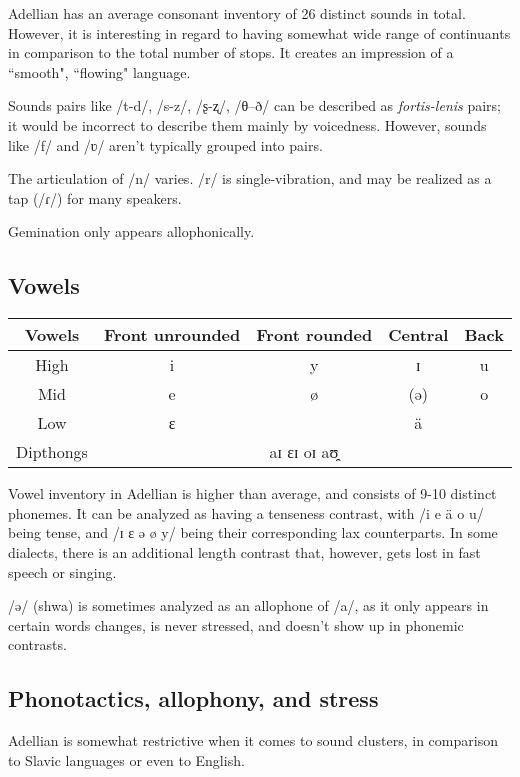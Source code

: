 \documentclass[12pt]{article}
\begin{document}
	Adellian has an average consonant inventory of 26 distinct sounds in total. However, it is interesting in regard to having somewhat wide range of continuants in comparison to the total number of stops. It creates an impression of a ``smooth", ``flowing" language.

	Sounds pairs like /t-d/, /s-z/, /ʂ-ʐ/, /θ–ð/ can be described as \emph{fortis-lenis} pairs; it would be incorrect to describe them mainly by voicedness. However, sounds like /f/ and /ʋ/ aren't typically grouped into pairs.

	The articulation of /n/ varies.	/r/ is single-vibration, and may be realized as a tap (/ɾ/) for many speakers.

	Gemination only appears allophonically.

	\subsection{Vowels}

	\begin{tabular}{|| c | c c c c || }
		\hline
		Vowels & Front unrounded & Front rounded & Central & Back \\
		\hline
		High & i & y & ɪ & u \\
		Mid & e & ø & (ə) & o \\
		Low & ɛ & & ä & \\
		Dipthongs & \multicolumn{4}{c||}{aɪ ɛɪ oɪ aʊ̯} \\
		\hline
	\end{tabular}

	Vowel inventory in Adellian is higher than average, and consists of 9-10 distinct phonemes. It can be analyzed as having a tenseness contrast, with /i e ä o u/ being tense, and /ɪ ɛ ə ø y/ being their corresponding lax counterparts. In some dialects, there is an additional length contrast that, however, gets lost in fast speech or singing.

	/ə/ (shwa) is sometimes analyzed as an allophone of /a/, as it only appears in certain words changes, is never stressed, and doesn't show up in phonemic contrasts.

	\subsection{Phonotactics, allophony, and stress}

	Adellian is somewhat restrictive when it comes to sound clusters, in comparison to Slavic languages or even to English.
\end{document}
